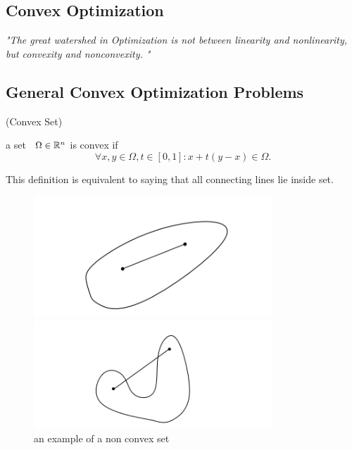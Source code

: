 \documentclass[12pt,oneside]{book} %
\begin{document}
\begin{spacing}{1}
\chapter{Convex Optimization}\label{chp:Convex Optimization}


\textit{"The great watershed in Optimization is not 
between linearity and nonlinearity, but convexity and nonconvexity. "}

\section{General Convex Optimization Problems}
\begin{definition}{
    (Convex Set) %
  }{%
  }
    {
        a set \ $\Omega\in \mathbb{R}^n$ is convex if 
         \begin{equation}
            \forall x,y \in \Omega, t\in [0,1]: x+t(y-x)\in \Omega. 
         \end{equation}


        
    }
\end{definition}


\begin{remark}
    This definition is equivalent to saying that
    all connecting lines lie inside set. 
\end{remark}

\begin{figure}[htbp]
    \begin{minipage}[t]{0.5\linewidth}
        \centering
        \includegraphics[width=0.8\textwidth]{figure/ch1/convex_set1.png}
        \caption{an example of a convex set}
    \end{minipage}%
    \begin{minipage}[t]{0.5\linewidth}
        \centering
        \includegraphics[width=0.8\textwidth]{figure/ch1/non_convex_set1.png}
        \caption{an example of a non convex set}
    \end{minipage}
\end{figure}



\end{spacing}
\end{document}
